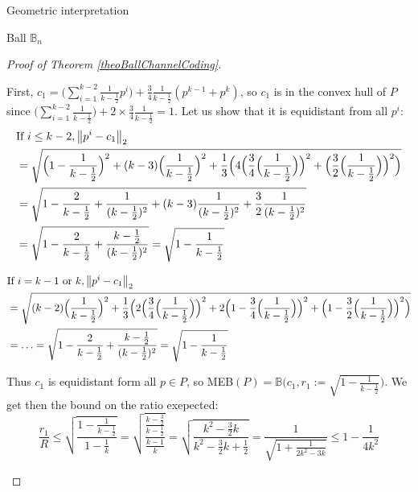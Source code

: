 \documentclass{article}
\theoremstyle{definition}
\theoremstyle{remark}
\begin{document}
\begin{subsection}{Geometric interpretation}
\begin{subsubsection}{Ball $\mathbb{B}_n$}
\begin{proof}[Proof of Theorem \ref{theoBallChannelCoding}]
\begin{itemize}
      First, $c_1 = \Big(\sum_{i=1}^{k-2}\frac{1}{k-\frac{1}{2}}p^i\Big) +\frac{3}{4}\frac{1}{k-\frac{1}{2}}(p^{k-1}+p^k)$, so $c_1$ is in the convex hull of $P$ since $\Big(\sum_{i=1}^{k-2}\frac{1}{k-\frac{1}{2}}\Big) +2\times\frac{3}{4}\frac{1}{k-\frac{1}{2}} = 1$. Let us show that it is equidistant from all $p^i$:
      \begin{equation}
        \begin{aligned}
          &\text{If } i \leq k-2, \norm{p^i-c_1}_2\\
          &= \sqrt{\Big(1-\frac{1}{k-\frac{1}{2}}\Big)^2 + (k-3)\Big(\frac{1}{k-\frac{1}{2}}\Big)^2 + \frac{1}{3}\Big( 4\Big(\frac{3}{4}\Big(\frac{1}{k-\frac{1}{2}}\Big) \Big)^2 + \Big(\frac{3}{2}\Big(\frac{1}{k-\frac{1}{2}}\Big) \Big)^2 \Big)}\\
          &= \sqrt{1 - \frac{2}{k-\frac{1}{2}} +\frac{1}{(k-\frac{1}{2})^2} + (k-3)\frac{1}{(k-\frac{1}{2})^2} + \frac{3}{2}\frac{1}{(k-\frac{1}{2})^2}}\\
          &= \sqrt{1 - \frac{2}{k-\frac{1}{2}} + \frac{k-\frac{1}{2}}{(k-\frac{1}{2})^2}}
          = \sqrt{1-\frac{1}{k-\frac{1}{2}}}
        \end{aligned}
      \end{equation}

      \begin{equation}
        \begin{aligned}
          &\text{If } i = k-1 \text{ or } k, \norm{p^i-c_1}_2\\
          &= \sqrt{(k-2)\Big(\frac{1}{k-\frac{1}{2}}\Big)^2 + \frac{1}{3}\Big( 2\Big(\frac{3}{4}\Big(\frac{1}{k-\frac{1}{2}}\Big) \Big)^2 + 2\Big(1 - \frac{3}{4}\Big(\frac{1}{k-\frac{1}{2}}\Big) \Big)^2 + \Big(1 - \frac{3}{2}\Big(\frac{1}{k-\frac{1}{2}}\Big) \Big)^2 \Big)}\\
          &= \ldots = \sqrt{1 - \frac{2}{k-\frac{1}{2}} + \frac{k-\frac{1}{2}}{(k-\frac{1}{2})^2}}
          = \sqrt{1-\frac{1}{k-\frac{1}{2}}}
        \end{aligned}
      \end{equation}

      Thus $c_1$ is equidistant form all $p \in P$, so MEB$(P)=\mathbb{B}\Big(c_1,r_1 := \sqrt{1-\frac{1}{k-\frac{1}{2}}}\Big)$. We get then the bound on the ratio exepected:
      \[ \frac{r_{1}}{R} \leq \sqrt{\frac{1-\frac{1}{k-\frac{1}{2}}}{1-\frac{1}{k}}} = \sqrt{\frac{\frac{k-\frac{3}{2}}{k-\frac{1}{2}}}{\frac{k-1}{k}}} = \sqrt{\frac{k^2-\frac{3}{2}k}{k^2-\frac{3}{2}k + \frac{1}{2}}} = \frac{1}{\sqrt{1 + \frac{1}{2k^2-3k}}} \leq 1 - \frac{1}{4k^2}\]
      

\end{itemize}
\end{proof}
\end{subsubsection}
\end{subsection}
\end{document}
